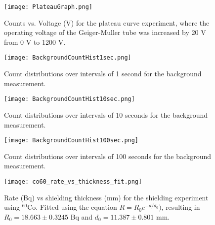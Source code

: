 \begin{figure}[H]
	\centering
	\texttt{[image: PlateauGraph.png]}
	\caption{Counts vs. Voltage (V) for the plateau curve experiment, where the operating voltage of the Geiger-Muller tube was increased by 20 V from 0 V to 1200 V.}
\end{figure}

\begin{figure}[H]
	\centering
	\texttt{[image: BackgroundCountHist1sec.png]}
	\caption{Count distributions over intervals of 1 second for the background measurement.}
\end{figure}

\begin{figure}[H]
	\centering
	\texttt{[image: BackgroundCountHist10sec.png]}
	\caption{Count distributions over intervals of 10 seconds for the background measurement.}
\end{figure}

\begin{figure}[H]
	\centering
	\texttt{[image: BackgroundCountHist100sec.png]}
	\caption{Count distributions over intervals of 100 seconds for the background measurement.}
\end{figure}

\begin{table}[H]
    \centering
     \label{tab:at} 
    
\end{table}

\begin{figure}[H]
	\centering
	\texttt{[image: co60\_rate\_vs\_thickness\_fit.png]}
	\caption{Rate (Bq) vs shielding thickness (mm) for the shielding experiment using $^{60}$Co. Fitted using the equation $R = R_0 e^{-d/d_0})$, resulting in $R_0 = 18.663 \pm 0.3245$ Bq and $d_0 = 11.387 \pm 0.801$ mm.}
\end{figure}

\pagebreak



